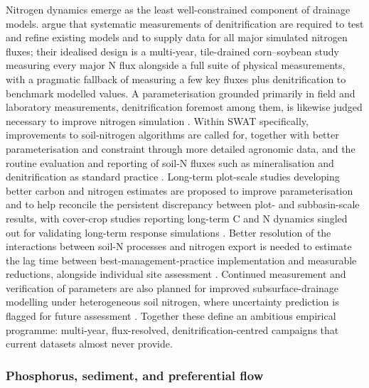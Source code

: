 Nitrogen dynamics emerge as the least well-constrained component of drainage models. \textcite{David2009} argue that systematic measurements of denitrification are required to test and refine existing models and to supply data for all major simulated nitrogen fluxes; their idealised design is a multi-year, tile-drained corn--soybean study measuring every major N flux alongside a full suite of physical measurements, with a pragmatic fallback of measuring a few key fluxes plus denitrification to benchmark modelled values. A parameterisation grounded primarily in field and laboratory measurements, denitrification foremost among them, is likewise judged necessary to improve nitrogen simulation \parencite{Salazar2009}. Within SWAT specifically, improvements to soil-nitrogen algorithms are called for, together with better parameterisation and constraint through more detailed agronomic data, and the routine evaluation and reporting of soil-N fluxes such as mineralisation and denitrification as standard practice \parencite{Ikenberry2017}. Long-term plot-scale studies developing better carbon and nitrogen estimates are proposed to improve parameterisation and to help reconcile the persistent discrepancy between plot- and subbasin-scale results, with cover-crop studies reporting long-term C and N dynamics singled out for validating long-term response simulations \parencite{Singer2011}. Better resolution of the interactions between soil-N processes and nitrogen export is needed to estimate the lag time between best-management-practice implementation and measurable reductions, alongside individual site assessment \parencite{Law2022}. Continued measurement and verification of parameters are also planned for improved subsurface-drainage modelling under heterogeneous soil nitrogen, where uncertainty prediction is flagged for future assessment \parencite{Tao2021}. Together these define an ambitious empirical programme: multi-year, flux-resolved, denitrification-centred campaigns that current datasets almost never provide.

\subsubsection{Phosphorus, sediment, and preferential flow}

